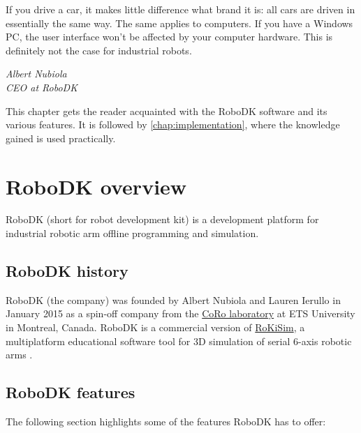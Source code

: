 \epigraph{If you drive a car, it makes little difference what brand it is: all cars are driven
in essentially the same way. The same applies to computers. If you have a
Windows PC, the user interface won’t be affected by your computer hardware.
This is definitely not the case for industrial robots.}{\textit{Albert Nubiola \\ CEO at RoboDK}}

This chapter gets the reader acquainted with the RoboDK software and its various features. It is followed by  \autoref{chap:implementation}, where the knowledge gained is used practically. 

\section{RoboDK overview}

RoboDK (short for robot development kit) is a development platform for industrial robotic arm offline programming and simulation. 

\subsection{RoboDK history}

RoboDK (the company) was founded by Albert Nubiola and Lauren Ierullo in January 2015 as a spin-off company from the \href{https://en.etsmtl.ca/unites-de-recherche/coro/accueil?lang=en-CA}{CoRo laboratory}   at ETS University in Montreal, Canada. RoboDK is a commercial version of \href{https://www.parallemic.org/RoKiSim.html}{RoKiSim}, a multiplatform educational software tool for 3D simulation of serial 6-axis robotic arms \cite{robodkoverview}.

\subsection{RoboDK features}

The following section highlights some of the features RoboDK has to offer: 

